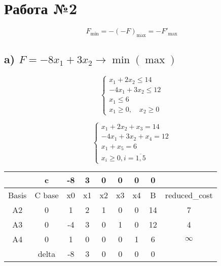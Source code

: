 \documentclass[17pt]{extarticle}
\begin{document}
\section*{Работа №2}

\[ F_{\text{min}} = -(-F)_{\text{max}} = -F'_{\text{max}} \]

\subsection*{a) \( F = -8x_1 + 3x_2 \to \min (\max) \)}

\[
    \begin{cases}
        x_1 + 2x_2 \leq 14   \\
        -4x_1 + 3x_2 \leq 12 \\
        x_1 \leq 6           \\
        x_1 \geq 0, \quad x_2 \geq 0
    \end{cases}
\]

\[
    \begin{cases}
        x_1 + 2x_2 + x_3 = 14   \\
        -4x_1 + 3x_2 + x_4 = 12 \\
        x_1 + x_5 = 6           \\
        x_i \geq 0, i=\overline{1, 5}
    \end{cases}
\]

\begin{table}[H]
    \centering
    \begin{tabular}{c|c|cccccc|c}
        \toprule
              & c      & -8 & 3  & 0  & 0  & 0  & 0                  \\
        \toprule
        Basis & C base & x0 & x1 & x2 & x3 & x4 & B  & reduced\_cost \\
        \midrule
        A2    & 0      & 1  & 2  & 1  & 0  & 0  & 14 & 7             \\
        A3    & 0      & -4 & 3  & 0  & 1  & 0  & 12 & 4             \\
        A4    & 0      & 1  & 0  & 0  & 0  & 1  & 6  & $\infty$      \\
        \midrule
              & delta  & -8 & 3  & 0  & 0  & 0  & 0  &               \\
        \bottomrule
    \end{tabular}
\end{table}
\end{document}
